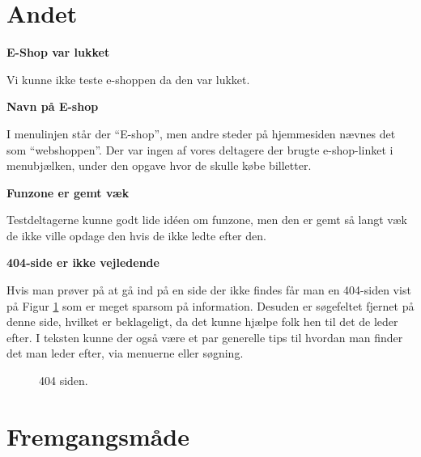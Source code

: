 \documentclass[10pt,a4paper]{article}      %
\newcommand{\kommentar}[2]{\item[#1] \textbf{#2}\par\nopagebreak}{}
\newcommand\pic[1]{\texttt{[image: Pics/\#1]}}
\renewcommand\smallproblem{\pic{smallproblem}}
\renewcommand\criticalproblem{\pic{criticalproblem}}
\begin{document}
\section{Andet}
\begin{kommentarer}

\kommentar{\criticalproblem}{E-Shop var lukket}

Vi kunne ikke teste e-shoppen da den var lukket.

\kommentar{\smallproblem}{Navn på E-shop}

I menulinjen står der ``E-shop'', men andre steder på hjemmesiden nævnes det som
``webshoppen''. Der var ingen af vores deltagere der brugte e-shop-linket i
menubjælken, under den opgave hvor de skulle købe billetter.

\kommentar{\smallproblem}{Funzone er gemt væk}

Testdeltagerne kunne godt lide idéen om funzone, men den er gemt så langt væk de
ikke ville opdage den hvis de ikke ledte efter den.

\kommentar{\smallproblem}{404-side er ikke vejledende}

Hvis man prøver på at gå ind på en side der ikke findes får man en 404-siden
vist på Figur \ref{fig:404} som er meget sparsom på information. Desuden er
søgefeltet fjernet på denne side, hvilket er beklageligt, da det kunne hjælpe
folk hen til det de leder efter. I teksten kunne der også være et par generelle
tips til hvordan man finder det man leder efter, via menuerne eller søgning. 

\begin{figure}[htbp]
    \centering
    \caption{404 siden.}
    \label{fig:404}
\end{figure}
\end{kommentarer}


\clearpage
\appendix
{}

\section{Fremgangsmåde}
\end{document}
